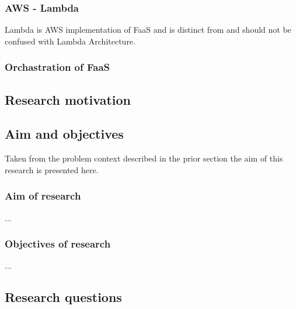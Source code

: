 \documentclass[a4paper,12pt]{article} %
\begin{document}



\subsubsection{AWS - Lambda}


Lambda is AWS implementation of FaaS and is distinct from and should not be confused with Lambda Architecture\cite{Astakhov2015}. 


\subsubsection{Orchastration of FaaS}

\subsection{Research motivation}



\subsection{Aim and objectives}
Taken from the problem context described in the prior section the aim of this research is presented here.

\subsubsection{Aim of research}
...

\subsubsection{Objectives of research}
...

\subsection{Research questions}
\end{document}
